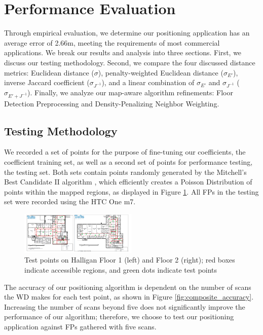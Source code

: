 \documentclass[conference]{IEEEtran}
\begin{document}
\section{Performance Evaluation}

Through empirical evaluation, we determine our positioning application has an average error of 2.66m, meeting the requirements of most commercial applications. We break our results and analysis into three sections. First, we discuss our testing methodology. Second, we compare the four discussed distance metrics: Euclidean distance ($\sigma$), penalty-weighted Euclidean distance ($\sigma_{E'}$), inverse Jaccard coefficient ($\sigma_{J^{-1}}$), and a linear combination of $\sigma_{E'}$ and $\sigma_{J^{-1}}$ ($\sigma_{E' + J^{-1}}$). Finally, we analyze our map-aware algorithm refinements: Floor Detection Preprocessing and Density-Penalizing Neighbor Weighting.

\subsection{Testing Methodology}
We recorded a set of points for the purpose of fine-tuning our coefficients, the coefficient training set, as well as a second set of points for performance testing, the testing set. Both sets contain points randomly generated by the Mitchell's Best Candidate II algorithm \cite{Machaj}, which efficiently creates a Poisson Distribution of points within the mapped regions, as displayed in Figure \ref{fig:test_points}. All FPs in the testing set were recorded using the HTC One m7. 

\begin{figure}[t!]
  \centering
    \includegraphics[width=0.5\textwidth]{testpoints}
   \caption{Test points on Halligan Floor 1 (left) and Floor 2 (right); red boxes indicate accessible regions, and green dots indicate test points}
   \label{fig:test_points}
\end{figure}

The accuracy of our positioning algorithm is dependent on the number of scans the WD makes for each test point, as shown in Figure \ref{fig:composite_accuracy}. Increasing the number of scans beyond five does not significantly improve the performance of our algorithm; therefore, we choose to test our positioning application against FPs gathered with five scans.
\end{document}
